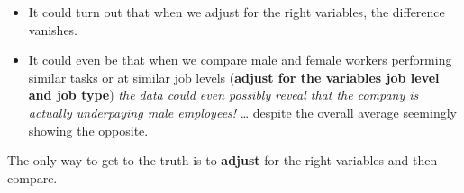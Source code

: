 \documentclass[
  12pt,
  letterpaper,
  DIV=11,
  numbers=noendperiod]{scrreprt}
\begin{document}
\begin{tcolorbox}[enhanced jigsaw, colback=white, leftrule=.75mm, toprule=.15mm, bottomtitle=1mm, breakable, coltitle=black, toptitle=1mm, title=\textcolor{quarto-callout-important-color}{\faExclamation}\hspace{0.5em}{Important}, opacitybacktitle=0.6, colbacktitle=quarto-callout-important-color!10!white, arc=.35mm, left=2mm, colframe=quarto-callout-important-color-frame, titlerule=0mm, rightrule=.15mm, bottomrule=.15mm, opacityback=0]

\begin{itemize}
\item
  It could turn out that when we adjust for the right variables, the
  difference vanishes.
\item
  It could even be that when we compare male and female workers
  performing similar tasks or at similar job levels (\textbf{adjust for
  the variables job level and job type}) \emph{the data could even
  possibly reveal that the company is actually underpaying male
  employees!} \ldots{} despite the overall average seemingly showing the
  opposite.
\end{itemize}

The only way to get to the truth is to \textbf{adjust} for the right
variables and then compare.

\end{tcolorbox}
\end{document}
